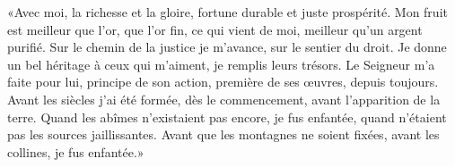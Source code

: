 «Avec moi, la richesse et la gloire, fortune durable et juste prospérité.
Mon fruit est meilleur que l’or, que l’or fin,
	ce qui vient de moi, meilleur qu’un argent purifié.
Sur le chemin de la justice je m’avance, sur le sentier du droit.
	Je donne un bel héritage à ceux qui m’aiment, je remplis leurs trésors.
Le Seigneur m’a faite pour lui, principe de son action,
	première de ses œuvres, depuis toujours.
Avant les siècles j’ai été formée,
	dès le commencement, avant l’apparition de la terre.
Quand les abîmes n’existaient pas encore, je fus enfantée,
	quand n’étaient pas les sources jaillissantes.
Avant que les montagnes ne soient fixées, avant les collines, je fus enfantée.»
